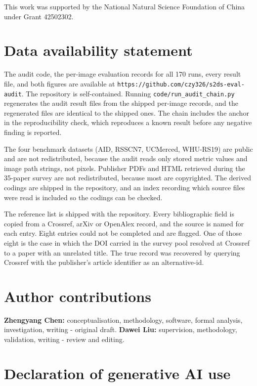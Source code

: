 \documentclass{interact}
\begin{document}
This work was supported by the National Natural Science Foundation of China under Grant 42502302.

\section*{Data availability statement}

The audit code, the per-image evaluation records for all 170 runs, every result file, and both figures are available at \texttt{https://github.com/czy326/s2ds-eval-audit}. The repository is self-contained. Running \texttt{code/run\_\allowbreak audit\_\allowbreak chain.py} regenerates the audit result files from the shipped per-image records, and the regenerated files are identical to the shipped ones. The chain includes the anchor in the reproducibility check, which reproduces a known result before any negative finding is reported.

The four benchmark datasets (AID, RSSCN7, UCMerced, WHU-RS19) are public and are not redistributed, because the audit reads only stored metric values and image path strings, not pixels. Publisher PDFs and HTML retrieved during the 35-paper survey are not redistributed, because most are copyrighted. The derived codings are shipped in the repository, and an index recording which source files were read is included so the codings can be checked.

The reference list is shipped with the repository. Every bibliographic field is copied from a Crossref, arXiv or OpenAlex record, and the source is named for each entry. Eight entries could not be completed and are flagged. One of those eight is the case in which the DOI carried in the survey pool resolved at Crossref to a paper with an unrelated title. The true record was recovered by querying Crossref with the publisher's article identifier as an alternative-id.

\section*{Author contributions}

\textbf{Zhengyang Chen:} conceptualisation, methodology, software, formal analysis, investigation, writing - original draft. \textbf{Dawei Liu:} supervision, methodology, validation, writing - review and editing.

\section*{Declaration of generative AI use}
\end{document}
